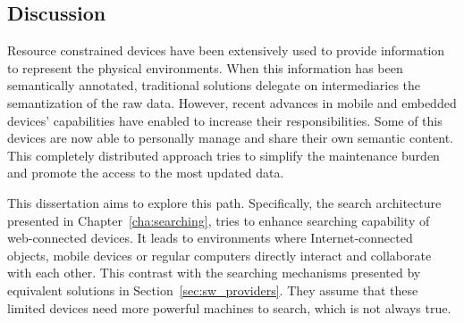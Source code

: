 \subsection{Discussion}

Resource constrained devices have been extensively used to provide information to represent the physical environments.
When this information has been semantically annotated, traditional solutions delegate on intermediaries the semantization of the raw data.
However, recent advances in mobile and embedded devices' capabilities have enabled to increase their responsibilities.
Some of this devices are now able to personally manage and share their own semantic content.
This completely distributed approach tries to simplify the maintenance burden and promote the access to the most updated data.


This dissertation aims to explore this path.
Specifically, the search architecture presented in Chapter~\ref{cha:searching}, tries to enhance searching capability of web-connected devices.
It leads to environments where Internet-connected objects, mobile devices or regular computers directly interact and collaborate with each other. %
This contrast with the searching mechanisms presented by equivalent solutions in Section~\ref{sec:sw_providers}.
They assume that these limited devices need more powerful machines to search, which is not always true. %
